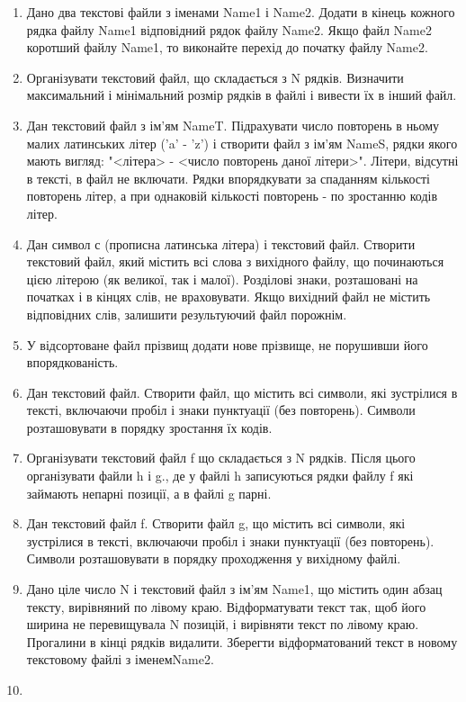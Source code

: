 \documentclass[]{article}
\begin{document}
\begin{enumerate}
\item
Дано два текстові файли з іменами Name1 і Name2. Додати в кінець кожного
рядка файлу Name1 відповідний рядок файлу Name2. Якщо файл Name2
коротший файлу Name1, то виконайте перехід до початку файлу Name2.
\item
Організувати текстовий файл, що складається з N рядків. Визначити
максимальний і мінімальний розмір рядків в файлі і вивести їх в інший
файл.
\item
Дан текстовий файл з ім'ям NameT. Підрахувати число повторень в ньому
малих латинських літер ('a' - 'z') і створити файл з ім'ям NameS, рядки
якого мають вигляд: "\textless{}літера\textgreater{} - \textless{}число
повторень даної літери\textgreater{}". Літери, відсутні в тексті, в файл
не включати. Рядки впорядкувати за спаданням кількості повторень літер,
а при однаковій кількості повторень - по зростанню кодів літер.
\item
Дан символ с (прописна латинська літера) і текстовий файл. Створити
текстовий файл, який містить всі слова з вихідного файлу, що починаються
цією літерою (як великої, так і малої). Розділові знаки, розташовані на
початках і в кінцях слів, не враховувати. Якщо вихідний файл не містить
відповідних слів, залишити результуючий файл порожнім.
\item
У відсортоване файл прізвищ додати нове прізвище, не порушивши його
впорядкованість.
\item
Дан текстовий файл. Створити файл, що містить всі символи, які
зустрілися в тексті, включаючи пробіл і знаки пунктуації (без
повторень). Символи розташовувати в порядку зростання їх кодів.
\item
Організувати текстовий файл f що складається з N рядків. Після цього
організувати файли h і g., де у файлі h записуються рядки файлу f які
займають непарні позиції, а в файлі g парні.
\item
Дан текстовий файл f. Створити файл g, що містить всі символи, які
зустрілися в тексті, включаючи пробіл і знаки пунктуації (без
повторень). Символи розташовувати в порядку проходження у вихідному
файлі.
\item
Дано ціле число N і текстовий файл з ім'ям Name1, що містить один абзац
тексту, вирівняний по лівому краю. Відформатувати текст так, щоб його
ширина не перевищувала N позицій, і вирівняти текст по лівому краю.
Прогалини в кінці рядків видалити. Зберегти відформатований текст в
новому текстовому файлі з іменемName2.
\item

\end{enumerate}
\end{document}
